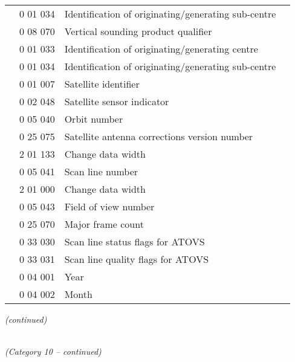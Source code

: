 \begin{longtable}[]{@{}llll@{}}
& 0 01 034 & Identification of originating/generating sub-centre &\tabularnewline
& 0 08 070 & Vertical sounding product qualifier &\tabularnewline
& 0 01 033 & Identification of originating/generating centre &\tabularnewline
& 0 01 034 & Identification of originating/generating sub-centre &\tabularnewline
& 0 01 007 & Satellite identifier &\tabularnewline
& 0 02 048 & Satellite sensor indicator &\tabularnewline
& 0 05 040 & Orbit number &\tabularnewline
& 0 25 075 & Satellite antenna corrections version number &\tabularnewline
& 2 01 133 & Change data width &\tabularnewline
& 0 05 041 & Scan line number &\tabularnewline
& 2 01 000 & Change data width &\tabularnewline
& 0 05 043 & Field of view number &\tabularnewline
& 0 25 070 & Major frame count &\tabularnewline
& 0 33 030 & Scan line status flags for ATOVS &\tabularnewline
& 0 33 031 & Scan line quality flags for ATOVS &\tabularnewline
& 0 04 001 & Year &\tabularnewline
& 0 04 002 & Month &\tabularnewline
\bottomrule
\end{longtable}

\emph{(continued)}

\emph{\\
(Category 10 -- continued)}

